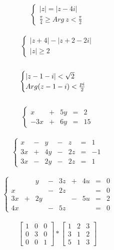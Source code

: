 \documentclass[a4paper]{article}
\begin{document}
$$ \left.
  \begin{cases}
    	|z| = |z - 4i| \\
    	\frac{\pi}{4} \geq Arg \ z < \frac{\pi}{2}
  \end{cases}
\right. $$ \\
$$ \left.
	\begin{cases}
		|z + 4| - |z + 2 - 2i| \\
		|z| \geq 2
	\end{cases}
\right. $$ \\
$$ \left.
	\begin{cases}
		|z - 1 - i| < \sqrt{2} \\
		Arg(z - 1 - i) < \frac{pi}{2}
	\end{cases}
\right. \\ $$ \\

$$ \left\{
	\begin{array}{rcccr}
		x & + & 5y & = & 2 \\
		-3x & + & 6y & = & 15
	\end{array}
\right. $$ \\

$$ \left\{
	\begin{array}{rcrcrcr}
		x & - & y & - & z & = & 1 \\
		3x & + & 4y & - & 2z & = & -1 \\
		3x & - & 2y & - & 2z & = & 1
	\end{array}
\right. $$ \\

$$ \left\{
	\begin{array}{rcrcrcrcr}
		& & y & - & 3z & + & 4u & = & 0 \\
		x & & & - & 2z & & & = & 0 \\
		3x & + & 2y & & & - & 5u & = & 2 \\
		4x & & & - & 5z & & & = & 0
	\end{array}
\right. $$ \\

$$ \left[
	\begin{array}{ccc}
		1 & 0 & 0 \\
		0 & 3 & 0 \\
		0 & 0 & 1 
	\end{array} \right] * \left[ \begin{array}{ccc}
		1 & 2 & 3 \\
		3 & 1 & 2 \\
		5 & 1 & 3 
	\end{array}
\right] $$ \\
\end{document}
